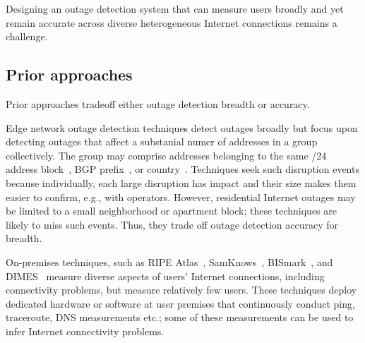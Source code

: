 Designing an outage detection system that can measure users
broadly and yet remain accurate across diverse heterogeneous
Internet connections remains a challenge.

\subsection{Prior approaches}

Prior approaches tradeoff either outage detection breadth or
accuracy. 

Edge network outage detection techniques detect outages broadly but
focus upon detecting outages that affect a substanial numer of addresses
in a group collectively. The group may comprise addresses belonging to the same /24 address block~\cite{trinocular, advancing-outage-art}, BGP
prefix~\cite{hubble}, or country~\cite{dainotti-imc11}. Techniques seek such disruption events because individually, each large disruption has
impact and their size makes them easier to confirm, e.g., with operators. However, residential Internet
outages may be limited to a small neighborhood or apartment block; these
techniques are likely to miss such events. Thus, they trade off outage detection accuracy
for breadth.

On-premises techniques, such as RIPE Atlas~\cite{atlas},
SamKnows~\cite{samknows}, BISmark~\cite{bismark-main-bib}, and
DIMES~\cite{netdimes} measure diverse aspects of users' Internet
connections, including connectivity problems, but measure relatively
few users. These techniques deploy dedicated hardware or software at
user premises that continuously conduct ping, traceroute, DNS
measurements etc.; some of these measurements can be used to infer
Internet connectivity problems.


